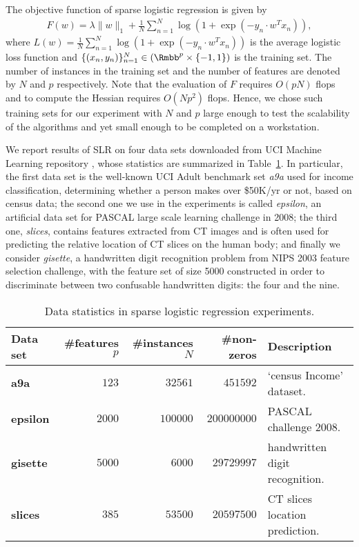 \documentclass[11pt]{article}
\numberwithin{equation}{section}
\begin{document}
The objective function of sparse logistic regression is given by
\begin{align*}
    F(w) = \lambda \|w\|_1 + \frac{1}{N} \sum_{n=1}^N \log(1 + \exp(-y_n \cdot w^Tx_n)),
\end{align*}
where $L(w) = \frac{1}{N} \sum_{n=1}^N \log(1 + \exp(-y_n \cdot w^Tx_n))$ is the
average logistic loss function and $ \{ ( x_n, y_n ) \}^N_{n=1} \in ( \Rmbb^p \times \{-1,1\} ) $ is the training set. The number of instances in the training set and the number of features are denoted by $N$ and $p$ respectively. Note that the evaluation of $F$ requires $O(pN)$ flops and  to compute the Hessian requires $O(Np^2)$ flops. Hence, we chose such training sets for our experiment with $N$ and $p$  large enough to test the scalability of the algorithms and yet small enough to be completed on a workstation. 

We report results of SLR on four data sets downloaded from UCI Machine Learning repository \cite{Bache+Lichman:2013}, whose statistics are summarized in Table~\ref{tab:Data_statistics}. In particular, the first data set is the well-known UCI Adult benchmark set \emph{a9a} used for income classification, determining whether a person makes over \$50K/yr or not, based on census data; the second one we use in the experiments is called \emph{epsilon}, an artificial data set for PASCAL large scale learning challenge in 2008; 
the third one, \emph{slices}, contains features extracted from CT images and is often used for predicting the relative location of CT slices on the human body; and finally we consider \emph{gisette}, a handwritten digit recognition problem from NIPS 2003 feature selection challenge, with the feature set of size 5000 constructed in order to discriminate between two confusable handwritten digits: the four and the nine. 

\begin{table}[h!]
\begin{center}
\begin{tabular}{|l|r|r|r|p{5cm}|}
    \hline
              \textbf{Data set}    & \#features $p$ & \#instances $N$ & \#non-zeros & Description \\
    \hline
        \textbf{a9a} &  $123$ & $32561$ & $451592$   & `census Income' dataset. \\
    \hline        
        \textbf{epsilon} &  $2000$ & $100000$ & $200000000$   &  PASCAL challenge 2008. \\
    \hline    
        \textbf{gisette} &  $5000$ & $6000$ & $29729997$  & handwritten digit recognition. \\
    \hline        
        \textbf{slices} &  $385$ & $53500$ & $20597500$   &  CT slices location prediction.\\   
    \hline
\end{tabular}
\end{center}
\caption{ Data statistics in sparse logistic regression experiments. }
\label{tab:Data_statistics}
\end{table}
\end{document}

